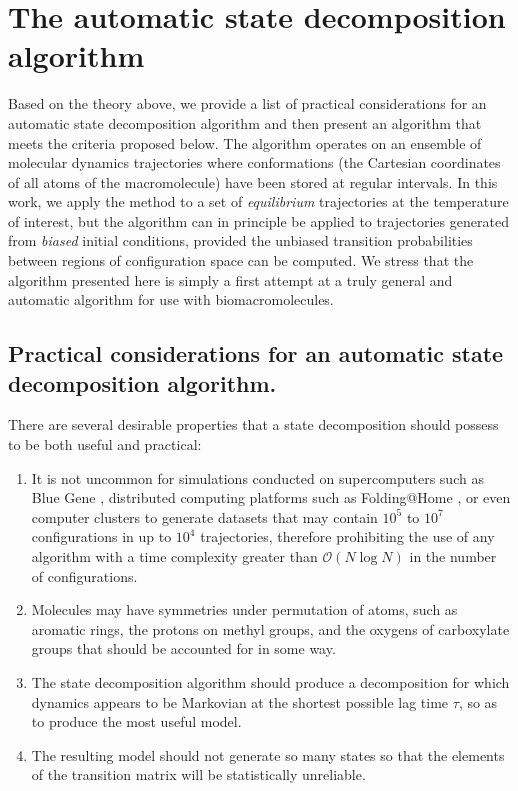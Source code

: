 \section{The automatic state decomposition algorithm}
\label{section:methods}


Based on the theory above, we provide a list of practical considerations for an automatic state decomposition algorithm and then present an algorithm that meets the criteria proposed below.
The algorithm operates on an ensemble of molecular dynamics trajectories where conformations (the Cartesian coordinates of all atoms of the macromolecule) have been stored at regular intervals.
In this work, we apply the method to a set of \emph{equilibrium} trajectories at the temperature of interest, but the algorithm can in principle be applied to trajectories generated from \emph{biased} initial conditions, provided the unbiased transition probabilities between regions of configuration space can be computed.
We stress that the algorithm presented here is simply a first attempt at a truly general and automatic algorithm for use with biomacromolecules. 

\subsection{Practical considerations for an automatic state decomposition algorithm.}
\label{section:methods:desiderata}

There are several desirable properties that a state decomposition should possess to be both useful and practical:
\begin{enumerate}
  \item It is not uncommon for simulations conducted on supercomputers such as Blue Gene \cite{fitch:2003a,germain:2005a}, distributed computing platforms such as Folding@Home \cite{pande:2000a,pande:2003a}, or even computer clusters to generate datasets that may contain $10^5$ to $10^7$ configurations in up to $10^4$ trajectories, therefore prohibiting the use of any algorithm with a time complexity greater than $\mathcal{O}(N \log N)$ in the number of configurations.
  \item Molecules may have symmetries under permutation of atoms, such as aromatic rings, the protons on methyl groups, and the oxygens of carboxylate groups that should be accounted for in some way.
  \item The state decomposition algorithm should produce a decomposition for which dynamics appears to be Markovian at the shortest possible lag time $\tau$, so as to produce the most useful model.
  \item The resulting model should not generate so many states so that the elements of the transition matrix will be statistically unreliable.
\end{enumerate}

